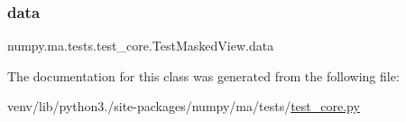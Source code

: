 \subsubsection{\texorpdfstring{data}{data}}
{\footnotesize\ttfamily numpy.\+ma.\+tests.\+test\+\_\+core.\+Test\+Masked\+View.\+data}



The documentation for this class was generated from the following file\+:\begin{DoxyCompactItemize}
\item 
venv/lib/python3./site-\/packages/numpy/ma/tests/\hyperlink{numpy_2ma_2tests_2test__core_8py}{test\+\_\+core.\+py}\end{DoxyCompactItemize}
